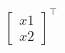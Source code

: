 \documentclass[preview]{standalone}
\begin{document}
\begin{align*}
\begin{bmatrix} x1 \\ x2 \end{bmatrix}^\top
\end{align*}
\end{document}
